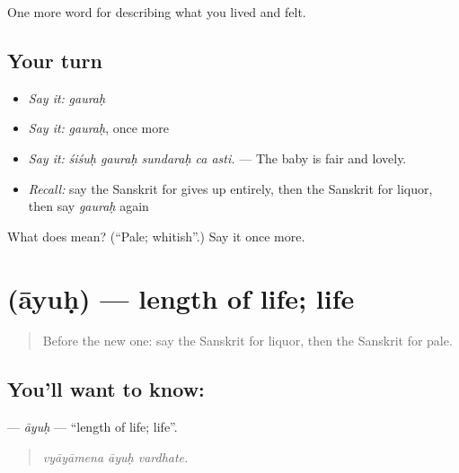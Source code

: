 \begin{grammarlens}[title={What you've built}]
One more word for describing what you lived and felt.
\end{grammarlens}

\subsection*{Your turn}
\begin{itemize}
\raggedright
  \item \emph{Say it:} \emph{gauraḥ}
  \item \emph{Say it:} \emph{gauraḥ}, once more
  \item \emph{Say it:} \emph{śiśuḥ gauraḥ sundaraḥ ca asti.} — The baby is fair and lovely.
  \item \emph{Recall:} say the Sanskrit for gives up entirely, then the Sanskrit for liquor, then say \emph{gauraḥ} again
\end{itemize}

\begin{tcolorbox}[breakable,colback=teal!4,colframe=teal!35!black,title={Before you move on}]
What does  mean? (\textquotedblleft{}Pale; whitish\textquotedblright{}.) Say it once more.
\end{tcolorbox}
\section[\texorpdfstring{\sk{आयुः} (āyuḥ)}{आयुः (āyuḥ)}]{ (āyuḥ) — length of life; life}

\label{lesson:SA-C490-ayuh}



\begin{quote}
Before the new one: say the Sanskrit for liquor, then the Sanskrit for pale.
\end{quote}

\subsection*{You'll want to know: }
\textbf{} — \emph{āyuḥ} — \textquotedblleft{}length of life; life\textquotedblright{}.

\begin{quote}
  
\end{quote}

\begin{quote}
\emph{vyāyāmena āyuḥ vardhate.}
\end{quote}

